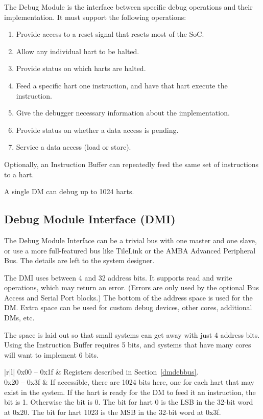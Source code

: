 \documentclass{article}
\newenvironment{steps}[1]
{
   \vspace{1ex}
   \noindent
   #1
   \begin{enumerate}[nosep]
}
{
   \end{enumerate}
   \vspace{1ex}
}
\begin{document}
\begin{steps}{The Debug Module is the interface between specific debug
    operations and their implementation. It must support the following
    operations:}
\item Provide access to a reset signal that resets most of the SoC.
\item Allow any individual hart to be halted.
\item Provide status on which harts are halted.
\item Feed a specific hart one instruction, and have that hart execute the
    instruction.
\item Give the debugger necessary information about the implementation.
\item Provide status on whether a data access is pending.
\item Service a data access (load or store).
\end{steps}

Optionally, an Instruction Buffer can repeatedly feed the same set of
instructions to a hart.

A single DM can debug up to 1024 harts.

\subsection{Debug Module Interface (DMI)}

The Debug Module Interface can be a trivial bus with one master and one slave,
or use a more full-featured bus like TileLink or the AMBA Advanced Peripheral
Bus. The details are left to the system designer.

The DMI uses between 4 and 32 address bits.  It supports read and write
operations, which may return an error. (Errors are only used by the optional
Bus Access and Serial Port blocks.) The bottom of the address space is used for
the DM. Extra space can be used for custom debug devices, other cores,
additional DMs, etc.

The space is laid out so that small systems can get away with just 4 address
bits. Using the Instruction Buffer requires 5 bits, and systems that have many
cores will want to implement 6 bits.

\begin{table}[htp]
    \centering
    \caption{Debug Module Interface Address Space}
    \label{tab:header}
    \begin{tabulary}{\textwidth}{|r|l|}
        \hline
        0x00 -- 0x1f & Registers described in Section~\ref{dmdebbus}. \\
        \hline
        0x20 -- 0x3f & If accessible, there are 1024 bits here, one for each
        hart that may exist in the system. If the hart is ready for the DM to
        feed it an instruction, the bit is 1. Otherwise the bit is 0. The bit
        for hart 0 is the LSB in the 32-bit word at 0x20. The bit for hart 1023
        is the MSB in the 32-bit word at 0x3f. \\
        \hline
    \end{tabulary}
\end{table}
\end{document}
